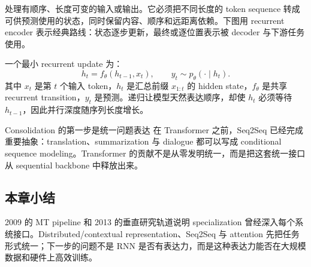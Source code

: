 处理有顺序、长度可变的输入或输出。它必须把不同长度的 token sequence 转成可供预测使用的状态，同时保留内容、顺序和远距离依赖。下图用 recurrent encoder 表示经典路线：状态逐步更新，最终或逐位置表示被 decoder 与下游任务使用。


一个最小 recurrent update 为：
\[
h_t=f_\theta(h_{t-1},x_t),\qquad y_t\sim p_\theta(\cdot\mid h_t).
\]
其中 $x_t$ 是第 $t$ 个输入 token，$h_t$ 是汇总前缀 $x_{1:t}$ 的 hidden state，$f_\theta$ 是共享 recurrent transition，$y_t$ 是预测。递归让模型天然表达顺序，却使 $h_t$ 必须等待 $h_{t-1}$，因此并行深度随序列长度增长。

\begin{importantbox}{Consolidation 的第一步是统一问题表达}
在 Transformer 之前，Seq2Seq 已经完成重要抽象：translation、summarization 与 dialogue 都可以写成 conditional sequence modeling。Transformer 的贡献不是从零发明统一，而是把这套统一接口从 sequential backbone 中释放出来。
\end{importantbox}

\subsection{本章小结}

2009 的 MT pipeline 和 2013 的垂直研究轨道说明 specialization 曾经深入每个系统接口。Distributed/contextual representation、Seq2Seq 与 attention 先把任务形式统一；下一步的问题不是 RNN 是否有表达力，而是这种表达力能否在大规模数据和硬件上高效训练。

